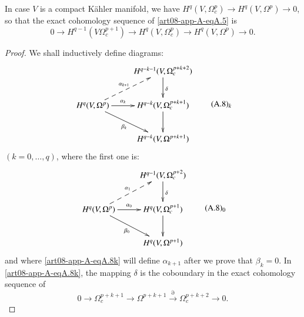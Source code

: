 \begin{appthm}[Dolbeault]\label{art08-app-A-thmA.6}
In case $V$ is a compact K\"ahler manifold, we have $H^{q}(V,\Omega^{p}_{c})\to H^{q}(V,\Omega^{p})\to 0$, so that the exact cohomology sequence of \eqref{art08-app-A-eqA.5} is
\begin{equation}
0\to H^{q-1}(V\Omega^{p+1}_{c})\to H^{q}(V,\Omega^{p}_{c})\to H^{q}(V,\Omega^{p})\to 0.\label{art08-app-A-eqA.7}
\end{equation}
\end{appthm}

\begin{proof}
We shall inductively define diagrams:
\begin{equation*}
\vcenter{\xymatrix{
 & H^{q-k-1}(V,\Omega^{p+k+2}_{c})\ar[d]^{\delta}\\
H^{q}(V,\Omega^{p})\ar[r]^-{\alpha_{k}}\ar@{-->}[ur]^-{\alpha_{k+1}}\ar[dr]_-{\beta_{k}} & H^{q-k}(V,\Omega^{p+k+1}_{c})\ar[d]\\
 & H^{q-k}(V,\Omega^{p+k+1})
}}\tag*{(A.8)$_{k}$}\label{art08-app-A-eqA.8k}
\end{equation*}
$(k=0,\ldots,q)$, where the first one is:
\begin{equation*}
\vcenter{\xymatrix{
 & H^{q-1}(V,\Omega^{p+2}_{c})\ar[d]^{\delta}\\
H^{q}(V,\Omega^{p})\ar[r]^-{\alpha_{0}}\ar@{-->}[ur]^-{\alpha_{1}}\ar[dr]_-{\beta_{0}} & H^{q}(V,\Omega^{p+1}_{c})\ar[d]\\
 & H^{q}(V,\Omega^{p+1})
}}\tag*{(A.8)$_{0}$}\label{art08-app-A-eqA.8-0}
\end{equation*}\pageoriginale
and where \ref{art08-app-A-eqA.8k} will define $\alpha_{k+1}$ after we prove that $\beta_{k}=0$. In \ref{art08-app-A-eqA.8k}, the mapping $\delta$ is the coboundary in the exact cohomology sequence of
$$
0\to \Omega^{p+k+1}_{c}\to \Omega^{p+k+1}\xrightarrow{\partial}\Omega_{c}^{p+k+2}\to 0.
$$


\end{proof}
